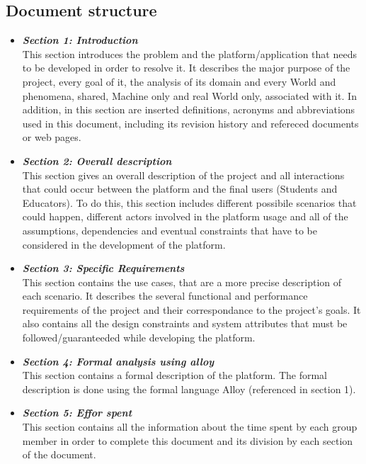 \documentclass{article}
\begin{document}
{\subsection{Document structure}
\begin{itemize}
    \item \textbf{\textit{Section 1: Introduction}} \\
          This section introduces the problem and the platform/application that needs to be developed in order to resolve it.
           It describes the major purpose of the project, every goal of it, the analysis of its domain and every World and phenomena, 
           shared, Machine only and real World only, associated with it.
          In addition, in this section are inserted definitions, acronyms and abbreviations used in this document, including 
          its revision history and refereced documents or web pages.
    \item \textbf{\textit{Section 2: Overall description}} \\
          This section gives an overall description of the project and all interactions that could occur between the platform 
          and the final users (Students and Educators). To do this, this section includes different possibile scenarios that could happen, 
          different actors involved in the platform usage and all of the assumptions, dependencies and eventual constraints that have 
          to be considered in the development of the platform.
    \item \textbf{\textit{Section 3: Specific Requirements}} \\
          This section contains the use cases, that are a more precise description of each scenario. 
          It describes the several functional and performance requirements of the project and their correspondance to the project's goals.
          It also contains all the design constraints and system attributes that must be followed/guaranteeded while developing the platform.
    \item \textbf{\textit{Section 4: Formal analysis using alloy}} \\
          This section contains a formal description of the platform. The formal description is done using the formal language Alloy 
          (referenced in section 1).
    \item \textbf{\textit{Section 5: Effor spent}} \\
        This section contains all the information about the time spent by each group member in order to complete this document 
          and its division by each section of the document.
\end{itemize}

}
\end{document}
